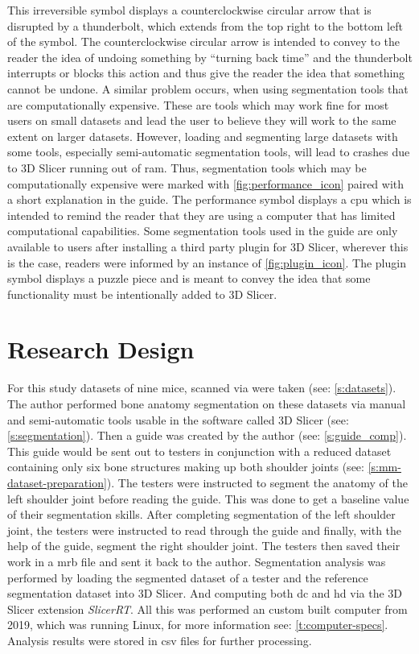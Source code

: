 This irreversible symbol displays a counterclockwise circular arrow that is disrupted by a thunderbolt, which extends from the top right to the bottom left of the symbol.
The counterclockwise circular arrow is intended to convey to the reader the idea of undoing something by ``turning back time'' and the thunderbolt interrupts or blocks this action and thus give the reader the idea that something cannot be undone.
A similar problem occurs, when using segmentation tools that are computationally expensive.
These are tools which may work fine for most users on small datasets and lead the user to believe they will work to the same extent on larger datasets.
However, loading and segmenting large datasets with some tools, especially semi-automatic segmentation tools, will lead to crashes due to 3D Slicer running out of \acrfull{ram}.
Thus, segmentation tools which may be computationally expensive were marked with \cref{fig:performance_icon} paired with a short explanation in the guide.
The performance symbol displays a \acrfull{cpu} which is intended to remind the reader that they are using a computer that has limited computational capabilities.
Some segmentation tools used in the guide are only available to users after installing a third party plugin for 3D Slicer, wherever this is the case, readers were informed by an instance of \cref{fig:plugin_icon}.
The plugin symbol displays a puzzle piece and is meant to convey the idea that some functionality must be intentionally added to 3D Slicer.

\section{Research Design}\label{s:researchDesign}
For this study datasets of nine mice, scanned via \mct\space were taken (see: \cref{s:datasets}).
The author performed bone anatomy segmentation on these datasets via manual and semi-automatic tools usable in the software called 3D Slicer (see: \cref{s:segmentation}).
Then a guide was created by the author (see: \cref{s:guide_comp}).
This guide would be sent out to testers in conjunction with a reduced dataset containing only six bone structures making up both shoulder joints (see: \cref{s:mm-dataset-preparation}).
The testers were instructed to segment the anatomy of the left shoulder joint before reading the guide.
This was done to get a baseline value of their segmentation skills.
After completing segmentation of the left shoulder joint, the testers were instructed to read through the guide and finally,
with the help of the guide, segment the right shoulder joint.
The testers then saved their work in a \acrfull{mrb} file and sent it back to the author.
Segmentation analysis was performed by loading the segmented dataset of a tester and the reference segmentation dataset into 3D Slicer.
And computing both \acrlong{dc} and \acrlong{hd} via the 3D Slicer extension \textit{SlicerRT}.
All this was performed an custom built computer from 2019,
which was running Linux, for more information see: \cref{t:computer-specs}.
Analysis results were stored in \acrfull{csv} files for further processing.


